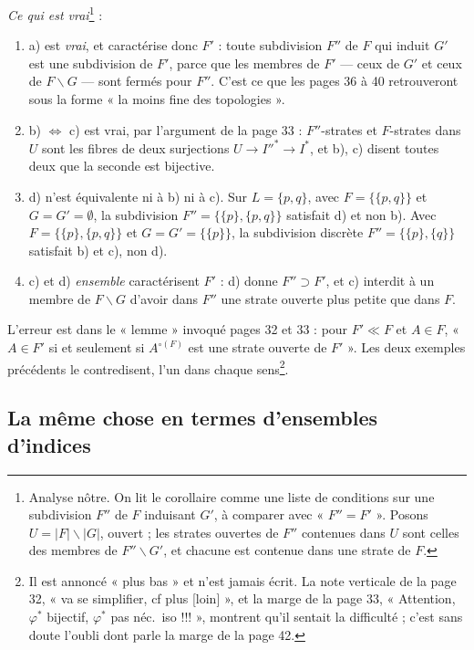 \documentclass[11pt,a4paper]{article}
\begin{document}
\emph{Ce qui est vrai}\footnote{Analyse nôtre. On lit le corollaire comme une
liste de conditions sur une subdivision $F''$ de $F$ induisant $G'$, à
comparer avec « $F'' = F'$ ». Posons $U = |F| \smallsetminus |G|$, ouvert ; les
strates ouvertes de $F''$ contenues dans $U$ sont celles des membres de $F''
\smallsetminus G'$, et chacune est contenue dans une strate de $F$.} :
\begin{enumerate}
\item[--] a) est \emph{vrai}, et caractérise donc $F'$ : toute subdivision $F''$
de $F$ qui induit $G'$ est une subdivision de $F'$, parce que les membres de
$F'$ --- ceux de $G'$ et ceux de $F \smallsetminus G$ --- sont fermés pour
$F''$. C'est ce que les pages 36 à 40 retrouveront sous la forme « la moins fine
des topologies ».
\item[--] b) $\Leftrightarrow$ c) est vrai, par l'argument de la page 33 :
$F''$-strates et $F$-strates dans $U$ sont les fibres de deux surjections
$U \to I''^{*} \to I^{*}$, et b), c) disent toutes deux que la seconde est
bijective.
\item[--] d) n'est équivalente ni à b) ni à c). Sur $L = \{p, q\}$, avec $F =
\{\{p, q\}\}$ et $G = G' = \emptyset$, la subdivision $F'' = \{\{p\}, \{p,q\}\}$
satisfait d) et non b). Avec $F = \{\{p\}, \{p,q\}\}$ et $G = G' = \{\{p\}\}$, la
subdivision discrète $F'' = \{\{p\}, \{q\}\}$ satisfait b) et c), non d).
\item[--] c) et d) \emph{ensemble} caractérisent $F'$ : d) donne $F'' \supset
F'$, et c) interdit à un membre de $F \smallsetminus G$ d'avoir dans $F''$ une
strate ouverte plus petite que dans $F$.
\end{enumerate}

L'erreur est dans le « lemme » invoqué pages 32 et 33 : pour $F' \ll F$ et $A
\in F$, « $A \in F'$ si et seulement si $A^{\circ (F)}$ est une strate ouverte
de $F'$ ». Les deux exemples précédents le contredisent, l'un dans chaque
sens\footnote{Il est annoncé « plus bas » et n'est jamais écrit. La note
verticale de la page 32, « va se simplifier, cf plus [loin] », et la marge de la
page 33, « Attention, $\varphi^{*}$ bijectif, $\varphi^{*}$ pas néc.\ iso !!! »,
montrent qu'il sentait la difficulté ; c'est sans doute l'oubli dont parle la
marge de la page 42.}.

\subsection*{La même chose en termes d'ensembles d'indices}
\end{document}
